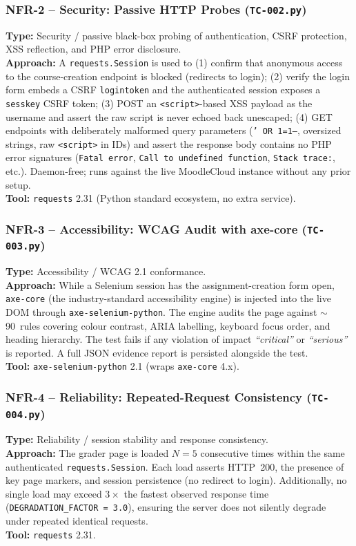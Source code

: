 \documentclass[twoside,final]{hcmut-report}
\begin{document}
\subsubsection{NFR-2 -- Security: Passive HTTP Probes (\texttt{TC-002.py})}
\textbf{Type:} Security / passive black-box probing of authentication, CSRF protection, XSS reflection, and PHP error disclosure.\\
\textbf{Approach:} A \texttt{requests.Session} is used to (1) confirm that anonymous access to the course-creation endpoint is blocked (redirects to login); (2) verify the login form embeds a CSRF \texttt{logintoken} and the authenticated session exposes a \texttt{sesskey} CSRF token; (3) POST an \texttt{<script>}-based XSS payload as the username and assert the raw script is never echoed back unescaped; (4) GET endpoints with deliberately malformed query parameters (\texttt{' OR 1=1--}, oversized strings, raw \texttt{<script>} in IDs) and assert the response body contains no PHP error signatures (\texttt{Fatal error}, \texttt{Call to undefined function}, \texttt{Stack trace:}, etc.). Daemon-free; runs against the live MoodleCloud instance without any prior setup.\\
\textbf{Tool:} \texttt{requests} 2.31 (Python standard ecosystem, no extra service).

\subsubsection{NFR-3 -- Accessibility: WCAG Audit with axe-core (\texttt{TC-003.py})}
\textbf{Type:} Accessibility / WCAG 2.1 conformance.\\
\textbf{Approach:} While a Selenium session has the assignment-creation form open, \texttt{axe-core} (the industry-standard accessibility engine) is injected into the live DOM through \texttt{axe-selenium-python}. The engine audits the page against $\sim$90~rules covering colour contrast, ARIA labelling, keyboard focus order, and heading hierarchy. The test fails if any violation of impact \emph{``critical''} or \emph{``serious''} is reported. A full JSON evidence report is persisted alongside the test.\\
\textbf{Tool:} \texttt{axe-selenium-python} 2.1 (wraps \texttt{axe-core} 4.x).

\subsubsection{NFR-4 -- Reliability: Repeated-Request Consistency (\texttt{TC-004.py})}
\textbf{Type:} Reliability / session stability and response consistency.\\
\textbf{Approach:} The grader page is loaded $N=5$ consecutive times within the same authenticated \texttt{requests.Session}. Each load asserts HTTP~200, the presence of key page markers, and session persistence (no redirect to login). Additionally, no single load may exceed $3\times$ the fastest observed response time (\texttt{DEGRADATION\_FACTOR~=~3.0}), ensuring the server does not silently degrade under repeated identical requests.\\
\textbf{Tool:} \texttt{requests} 2.31.
\end{document}
